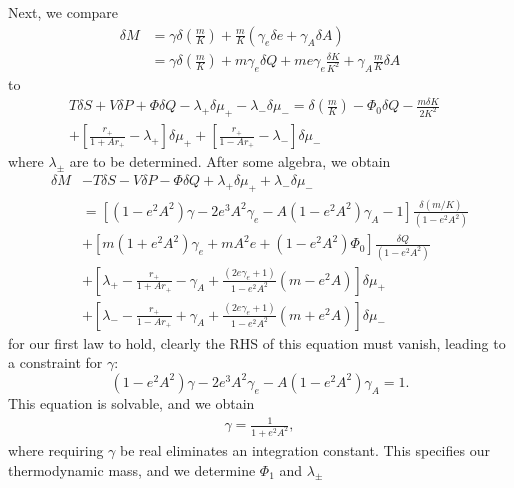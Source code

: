 \documentclass[
twoside,
openright,
frontopenright,
]{dmathesis}
\newcommand{\nn}{\nonumber}
\begin{document}
Next, we compare
\begin{align}
\delta M &= \gamma \delta \left ( \frac{m}{K} \right ) 
+ \frac{m}{K} (\gamma_e \delta e + \gamma_A \delta A)
\nn\\&= \gamma \delta \left ( \frac{m}{K} \right ) 
+ m \gamma_e \delta Q + m e \gamma_e \frac{\delta K}{K^2}
+ \gamma_A \frac{m}{K} \delta A
\end{align}
to
\begin{align}
T \delta S + V \delta P + \Phi \delta Q -\lambda_+ \delta \mu_+ - \lambda_-\delta \mu_-
= \delta \left ( \frac{m}{K} \right ) 
- \Phi_0 \delta Q - \frac{m\delta K}{2K^2}&\nn\\
+ \left [ \frac{r_+}{1+Ar_+} - \lambda _+ \right]\delta \mu_+
+ \left [ \frac{r_+}{1-Ar_+} - \lambda _- \right]\delta \mu_-&
\end{align}
where $\lambda_\pm$ are to be determined. After some
algebra, we obtain
\begin{align}
  \label{eq:firstlawder1}
  \delta M &- T \delta S - V \delta P - \Phi \delta Q + \lambda_+ \delta \mu_+ +
             \lambda_-\delta \mu_-\nn\\
           &= \left [ (1-e^2 A^2) \gamma-2 e^3A^2 \gamma_e -
             A(1-e^2 A^2) \gamma_A -1 \right] \frac{ \delta \left ( {m/K} \right )
             }{(1-e^2A^2)} \nn\\
           &+ \left [ m (1+e^2 A^2) \gamma_e + mA^2 e +(1-e^2 A^2)
             \Phi_0 \right] \frac{ \delta Q }{(1-e^2A^2) }\nn\\
           &+ \left [ \lambda_+ -\frac{r_+}{1+Ar_+} - \gamma_A +
             \frac{(2e\gamma_e+1)}{1-e^2 A^2} \left ( m - e^2A \right) \right]
             \delta \mu_+\nn\\
           &+ \left [ \lambda_- - \frac{r_+}{1-Ar_+} + \gamma_A
             +\frac{(2e\gamma_e+1)}{1-e^2 A^2} \left ( m + e^2A \right) \right]
             \delta \mu_- 
\end{align}
for our first law to hold, clearly the RHS of this equation must vanish, leading
to a constraint for $\gamma$:
\begin{equation}
(1-e^2 A^2) \gamma-2 e^3A^2 \gamma_e - A(1-e^2 A^2) \gamma_A =1.
\end{equation}
This equation is solvable, and we obtain
\begin{align}
  \gamma = \frac{1}{1+e^2 A^2},
\end{align}
where requiring $\gamma$ be real eliminates an integration constant. This
specifies our thermodynamic mass, and we determine $\Phi_1$ and $\lambda_\pm$
\end{document}
